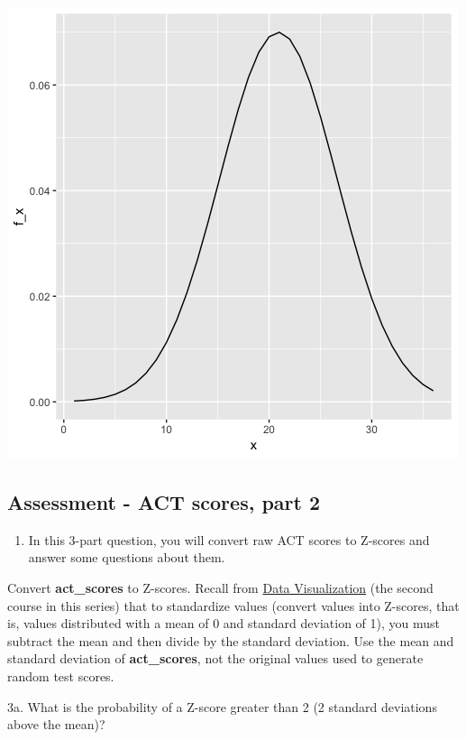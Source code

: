 \documentclass[
]{article}
\providecommand{\tightlist}{%
  \setlength{\itemsep}{0pt}\setlength{\parskip}{0pt}}
\begin{document}
\includegraphics{images/x_f_x_imageB.png} \newpage

\hypertarget{assessment---act-scores-part-2}{%
\subsection{Assessment - ACT scores, part
2}\label{assessment---act-scores-part-2}}

\begin{enumerate}
\def\labelenumi{\arabic{enumi}.}
\setcounter{enumi}{2}
\tightlist
\item
  In this 3-part question, you will convert raw ACT scores to Z-scores
  and answer some questions about them.
\end{enumerate}

Convert \textbf{act\_scores} to Z-scores. Recall from
\href{https://www.edx.org/course/data-science-visualization}{Data
Visualization} (the second course in this series) that to standardize
values (convert values into Z-scores, that is, values distributed with a
mean of 0 and standard deviation of 1), you must subtract the mean and
then divide by the standard deviation. Use the mean and standard
deviation of \textbf{act\_scores}, not the original values used to
generate random test scores.

3a. What is the probability of a Z-score greater than 2 (2 standard
deviations above the mean)?
\end{document}
